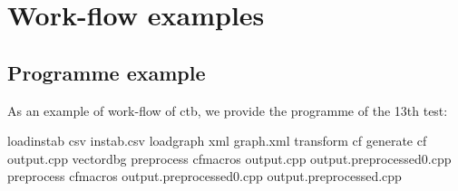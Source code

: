 
\section{Work-flow examples}

\subsection*{Programme example}

As an example of work-flow of ctb, we provide the programme of the 13th test:

\mybeginfig
\begin{code}
loadinstab csv instab.csv
loadgraph xml graph.xml
transform cf
generate cf output.cpp vectordbg
preprocess cfmacros output.cpp output.preprocessed0.cpp
preprocess cfmacros output.preprocessed0.cpp output.preprocessed.cpp
\end{code}

